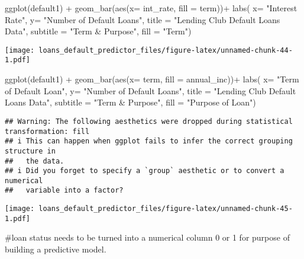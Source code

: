 \documentclass[
]{article}
\newenvironment{Shaded}{\begin{snugshade}}{\end{snugshade}}
\newcommand{\AttributeTok}[1]{\textcolor[rgb]{0.77,0.63,0.00}{#1}}
\newcommand{\FunctionTok}[1]{\textcolor[rgb]{0.00,0.00,0.00}{#1}}
\newcommand{\NormalTok}[1]{#1}
\newcommand{\SpecialCharTok}[1]{\textcolor[rgb]{0.00,0.00,0.00}{#1}}
\newcommand{\StringTok}[1]{\textcolor[rgb]{0.31,0.60,0.02}{#1}}
\begin{document}
\begin{Shaded}
\begin{Highlighting}[]
\FunctionTok{ggplot}\NormalTok{(default1) }\SpecialCharTok{+}
  \FunctionTok{geom\_bar}\NormalTok{(}\FunctionTok{aes}\NormalTok{(}\AttributeTok{x=}\NormalTok{ int\_rate, }\AttributeTok{fill =}\NormalTok{ term))}\SpecialCharTok{+}
  \FunctionTok{labs}\NormalTok{( }\AttributeTok{x=} \StringTok{"Interest Rate"}\NormalTok{,}
        \AttributeTok{y=} \StringTok{"Number of Default Loans"}\NormalTok{,}
        \AttributeTok{title =} \StringTok{"Lending Club Default Loans Data"}\NormalTok{,}
        \AttributeTok{subtitle =} \StringTok{"Term \& Purpose"}\NormalTok{,}
        \AttributeTok{fill =} \StringTok{"Term"}\NormalTok{)}
\end{Highlighting}
\end{Shaded}

\texttt{[image: loans\_default\_predictor\_files/figure-latex/unnamed-chunk-44-1.pdf]}

\begin{Shaded}
\begin{Highlighting}[]
\FunctionTok{ggplot}\NormalTok{(default1) }\SpecialCharTok{+}
  \FunctionTok{geom\_bar}\NormalTok{(}\FunctionTok{aes}\NormalTok{(}\AttributeTok{x=}\NormalTok{ term, }\AttributeTok{fill =}\NormalTok{ annual\_inc))}\SpecialCharTok{+}
  \FunctionTok{labs}\NormalTok{( }\AttributeTok{x=} \StringTok{"Term of Default Loan"}\NormalTok{,}
        \AttributeTok{y=} \StringTok{"Number of Default Loans"}\NormalTok{,}
        \AttributeTok{title =} \StringTok{"Lending Club Default Loans Data"}\NormalTok{,}
        \AttributeTok{subtitle =} \StringTok{"Term \& Purpose"}\NormalTok{,}
        \AttributeTok{fill =} \StringTok{"Purpose of Loan"}\NormalTok{)}
\end{Highlighting}
\end{Shaded}

\begin{verbatim}
## Warning: The following aesthetics were dropped during statistical transformation: fill
## i This can happen when ggplot fails to infer the correct grouping structure in
##   the data.
## i Did you forget to specify a `group` aesthetic or to convert a numerical
##   variable into a factor?
\end{verbatim}

\texttt{[image: loans\_default\_predictor\_files/figure-latex/unnamed-chunk-45-1.pdf]}

\#loan status needs to be turned into a numerical column 0 or 1 for
purpose of building a predictive model.
\end{document}
